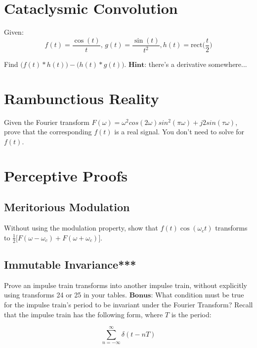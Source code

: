 \documentclass{article}
\begin{document}
\vfill

\newpage

\section{Cataclysmic Convolution}

Given:$$f(t) = \frac{\cos(t)}{t},\, g(t) = \frac{\sin(t)}{t^2}, h(t) = \text{rect}\bigg(\frac{t}{2}\bigg)$$

Find $\big(f(t)*h(t)\big) - \big(h(t)*g(t)\big)$. $\textbf{Hint:}$ there's a derivative somewhere...

\vfill

\section{Rambunctious Reality}

Given the Fourier transform $F(\omega) = \omega^2cos(2\omega)sin^2(\pi\omega) + j2sin(\tau\omega)$, prove that the corresponding $f(t)$ is a real signal. You don't need to solve for $f(t)$.

\vfill

\newpage


\section{Perceptive Proofs}

\subsection{Meritorious Modulation}
Without using the modulation property, show that $f(t)\cos(\omega_c t)$ transforms to $\frac{1}{2}\big[F(\omega - \omega_c) + F(\omega + \omega_c)\big]$.
\vfill

\subsection{Immutable Invariance***}
Prove an impulse train transforms into another impulse train, without explicitly using transforms 24 or 25 in your tables. 
\newline
$\textbf{Bonus:}$ What condition must be true for the impulse train's period to be invariant under the Fourier Transform?
Recall that the impulse train has the following form, where $T$ is the period:

$$\sum_{n = -\infty}^{\infty} \delta(t - nT)$$

\vfill
\end{document}
